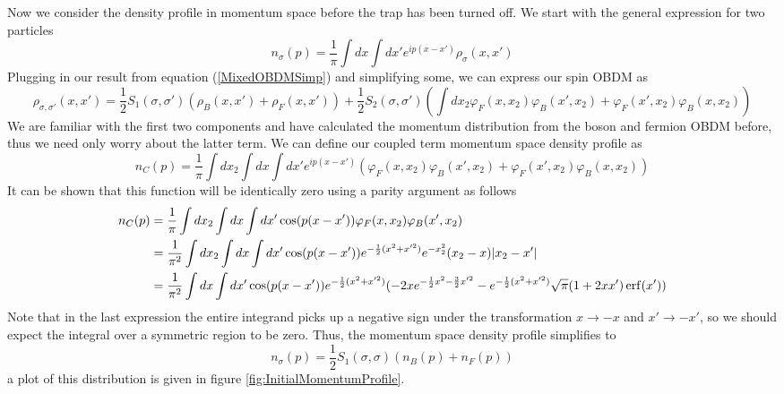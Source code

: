 \documentclass[onecolumn,english,aps,pra]{revtex4}
\begin{document}
Now we consider the density profile in momentum space before the trap has been turned off. We start with the general expression for two particles
\begin{equation}
n_{\sigma}(p) = \frac{1}{\pi} \int dx \int dx' e^{ip(x-x')} \rho_{\sigma}(x,x')
\end{equation}
Plugging in our result from equation (\ref{MixedOBDMSimp}) and simplifying some, we can express our spin OBDM as
\begin{equation}
\rho_{\sigma, \sigma'}(x,x') = \frac{1}{2}S_1(\sigma, \sigma')(\rho_B(x,x') + \rho_F(x,x')) + \frac{1}{2}S_2(\sigma, \sigma')(\int dx_2 \varphi_F(x,x_2)\varphi_B(x',x_2) + \varphi_F(x',x_2)\varphi_B(x,x_2))
\end{equation}
We are familiar with the first two components and have calculated the momentum distribution from the boson and fermion OBDM before, thus we need only worry about the latter term. We can define our coupled term momentum space density profile as 
\begin{equation}
n_C(p) = \frac{1}{\pi}\int dx_2  \int dx \int dx' e^{ip(x-x')}(\varphi_F(x,x_2)\varphi_B(x',x_2) + \varphi_F(x',x_2)\varphi_B(x,x_2))
\label{ncInitMom}
\end{equation}
It can be shown that this function will be identically zero using a parity argument as follows
\begin{align*}
n_C(p) & = \frac{1}{\pi}\int dx_2  \int dx \int dx' \cos(p(x-x'))\varphi_F(x,x_2)\varphi_B(x',x_2) \\
& = \frac{1}{\pi^2}\int dx_2  \int dx \int dx' \cos(p(x-x')) e^{-\frac{1}{2} (x^2 + x'^2)} e^{-x_2^2} (x_2 -x) |x_2 - x'|\\
& = \frac{1}{\pi^2} \int dx \int dx' \cos(p(x-x')) e^{-\frac{1}{2} (x^2 + x'^2)} 
(-2x e^{-\frac{1}{2}x^2 -\frac{3}{2}x'^2} - e^{-\frac{1}{2}(x^2 + x'^2)}\sqrt{\pi} (1+2xx')\erf(x'))
\end{align*}
Note that in the last expression the entire integrand picks up a negative sign under the transformation $x \rightarrow -x$ and $x' \rightarrow -x'$, so we should expect the integral over a symmetric region to be zero. Thus, the momentum space density profile simplifies to
\begin{equation}
n_{\sigma}(p) =  \frac{1}{2}S_1(\sigma, \sigma)(n_B(p) + n_F(p))
\end{equation}
a plot of this distribution is given in figure \ref{fig:InitialMomentumProfile}. 
\end{document}

